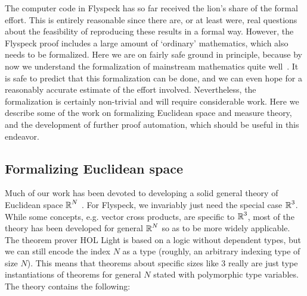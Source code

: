 \documentclass[11pt]{amsart}
\newcommand{\real}{\mbox{$\protect\mathbb R$}}
\begin{document}
The computer code in Flyspeck has so far received the lion's share of the
formal effort. This is entirely reasonable since there are, or at least were,
real questions about the feasibility of reproducing these results in a formal
way. However, the Flyspeck proof includes a large amount of `ordinary'
mathematics, which also needs to be formalized. Here we are on fairly safe
ground in principle, because by now we understand the formalization of
mainstream mathematics quite well~\cite{wiedijk-17}. It is safe to predict that
this formalization can be done, and we can even hope for a reasonably accurate
estimate of the effort involved. Nevertheless, the formalization is certainly
non-trivial and will require considerable work. Here we describe some of the
work on formalizing Euclidean space and measure theory, and the development of
further proof automation, which should be useful in this endeavor.

\subsection*{Formalizing Euclidean space}

Much of our work has been devoted to developing a solid general theory of
Euclidean space $\real^N$ \cite{harrison-euclidean}. For Flyspeck, we
invariably just need the special case $\real^3$. While some concepts, e.g.
vector cross products, are specific to $\real^3$, most of the theory has been
developed for general $\real^N$ so as to be more widely applicable. The theorem
prover HOL Light \cite{harrison-demo} is based on a logic without dependent
types, but we can still encode the index $N$ as a type (roughly, an arbitrary
indexing type of size $N$). This means that theorems about specific sizes like
$3$ really are just type instantiations of theorems for general $N$ stated with
polymorphic type variables. The theory contains the following:
\end{document}

